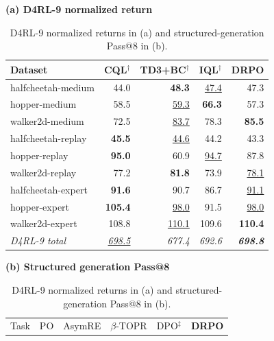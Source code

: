 \documentclass{article}
\theoremstyle{plain}
\theoremstyle{definition}
\theoremstyle{remark}
\begin{document}
\begin{table}[t]
\centering
\caption{D4RL-9 normalized returns in (a) and structured-generation Pass@8 in (b).}
\label{tab:external_task_performance}
\label{tab:d4rl_performance}
\label{tab:structured_generation_performance}
\vspace{-2pt}

\begin{minipage}[t]{0.465\textwidth}
\centering
\textbf{(a) D4RL-9 normalized return}\par\vspace{2pt}
{\scriptsize
\setlength{\tabcolsep}{2.05pt}
\renewcommand{\arraystretch}{1.04}
\begin{tabular}{@{}lrrrr@{}}
\toprule
Dataset & CQL$^\dagger$ & TD3+BC$^\dagger$ & IQL$^\dagger$ & \textbf{DRPO} \\
\midrule
halfcheetah-medium & 44.0 & \textbf{48.3} & \underline{47.4} & 47.3 \\
hopper-medium & 58.5 & \underline{59.3} & \textbf{66.3} & 57.3 \\
walker2d-medium & 72.5 & \underline{83.7} & 78.3 & \textbf{85.5} \\
halfcheetah-replay & \textbf{45.5} & \underline{44.6} & 44.2 & 43.3 \\
hopper-replay & \textbf{95.0} & 60.9 & \underline{94.7} & 87.8 \\
walker2d-replay & 77.2 & \textbf{81.8} & 73.9 & \underline{78.1} \\
halfcheetah-expert & \textbf{91.6} & 90.7 & 86.7 & \underline{91.1} \\
hopper-expert & \textbf{105.4} & \underline{98.0} & 91.5 & \underline{98.0} \\
walker2d-expert & 108.8 & \underline{110.1} & 109.6 & \textbf{110.4} \\
\midrule
\textit{D4RL-9 total} & \textit{\underline{698.5}} & \textit{677.4} &
\textit{692.6} & \textbf{\textit{698.8}} \\
\bottomrule
\end{tabular}
}
\end{minipage}
\hfill
\begin{minipage}[t]{0.515\textwidth}
\centering
\textbf{(b) Structured generation Pass@8}\par\vspace{2pt}
{\scriptsize
\setlength{\tabcolsep}{2.1pt}
\renewcommand{\arraystretch}{1.04}
\begin{tabular}{@{}lrrrrr@{}}
\toprule
Task & PO & AsymRE & $\beta$-TOPR & DPO$^\ddagger$ & \textbf{DRPO} \\

\end{tabular}}
\end{minipage}
\end{table}
\end{document}
